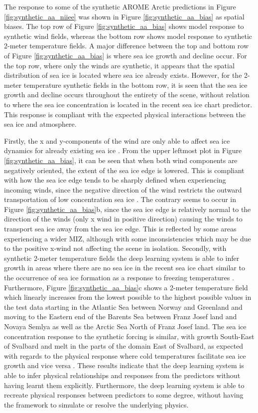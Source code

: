 \documentclass[../main/thesis]{subfiles}
\begin{document}
The response to some of the synthetic AROME Arctic predictions in Figure \ref{fig:synthetic_aa_niiee} was shown in Figure \ref{fig:synthetic_aa_bias} as spatial biases. The top row of Figure \ref{fig:synthetic_aa_bias} shows model response to synthetic wind fields, whereas the bottom row shows model response to synthetic 2-meter temperature fields. A major difference between the top and bottom row of Figure \ref{fig:synthetic_aa_bias} is where sea ice growth and decline occur. For the top row, where only the winds are synthetic, it appears that the spatial distribution of sea ice is located where sea ice already exists. However, for the 2-meter temperature synthetic fields in the bottom row, it is seen that the sea ice growth and decline occurs throughout the entirety of the scene, without relation to where the sea ice concentration is located in the recent sea ice chart predictor. This response is compliant with the expected physical interactions between the sea ice and atmosphere. 

Firstly, the x and y-components of the wind are only able to affect sea ice dynamics for already existing sea ice \citep{Spreen2011, Yu2020}. From the upper leftmost plot in Figure \ref{fig:synthetic_aa_bias}, it can be seen that when both wind components are negatively oriented, the extent of the sea ice edge is lowered. This is compliant with how the sea ice edge tends to be sharply defined when experiencing incoming winds, since the negative direction of the wind restricts the outward transportation of low concentration sea ice \citep{Yu2020}. The contrary seems to occur in Figure \ref{fig:synthetic_aa_bias}b, since the sea ice edge is relatively normal to the direction of the winds (only x wind in positive direction) causing the winds to transport sea ice away from the sea ice edge. This is reflected by some areas experiencing a wider MIZ, although with some inconsistencies which may be due to the positive x-wind not affecting the scene in isolation. Secondly, with synthetic 2-meter temperature fields the deep learning system is able to infer growth in areas where there are no sea ice in the recent sea ice chart similar to the occurrence of sea ice formation as a response to freezing temperatures \citep{Hibler1979}. Furthermore, Figure \ref{fig:synthetic_aa_bias}c shows a 2-meter temperature field which linearly increases from the lowest possible to the highest possible values in the test data starting in the Atlantic Sea between Norway and Greenland and moving to the Eastern end of the Barents Sea between Franz Josef land and Novaya Semlya as well as the Arctic Sea North of Franz Josef land. The sea ice concentration response to the synthetic forcing is similar, with growth South-East of Svalbard and melt in the parts of the domain East of Svalbard, as expected with regards to the physical response where cold temperatures facilitate sea ice growth and vice versa \citep{Hibler1979}. These results indicate that the deep learning system is able to infer physical relationships and responses from the predictors without having learnt them explicitly. Furthermore, the deep learning system is able to recreate physical responses between predictors to some degree, without having the framework to simulate or resolve the underlying physics.
\end{document}
